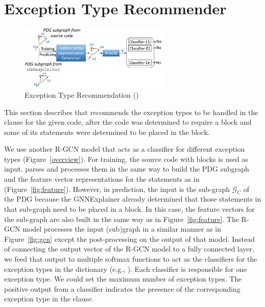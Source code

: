 \section{Exception Type Recommender}
\label{sec:type}

\begin{figure}[t]
\begin{center}
\includegraphics[width=2.8in]{xtype-3.png}
\vspace{-10pt}
\caption{Exception Type Recommendation ({\xtype})}
\label{fig:xtype}
\end{center}
\end{figure}

This section describes {\xtype} that recommends the exception types to
be handled in the  clause for the given code, after the code was
determined to require a  block and some of its
statements were determined to be placed in the  block.

We use another R-GCN model that acts as a classifier for different
exception types (Figure~\ref{overview}). For training, the source code
with  blocks is used as input. {\tool} parses and
processes them in the same way to build the PDG subgraph and the
feature vector representations for the statements as in {\xblock}
(Figure~\ref{fig:feature}). However, in prediction, the input is the
sub-graph $\mathcal{G}_C$ of the PDG because the GNNExplainer already
determined that those statements in that sub-graph need to be placed
in a  block. In this case, the feature vectors for the
sub-graph are also built in the same way as in
Figure~\ref{fig:feature}. The R-GCN model processes the input
(sub)graph in a similar manner as in Figure~\ref{fig:gcn} except the
post-processing on the output of that model.  Instead of connecting
the output vector of the R-GCN model to a fully connected layer, we
feed that output to multiple softmax functions to act as the
classifiers for the exception types in the dictionary (e.g.,
). Each classifier is responsible for one exception
type.  We could set the maximum number of exception types. The
positive output from a classifier indicates the presence of the
corresponding exception type in the  clause.
